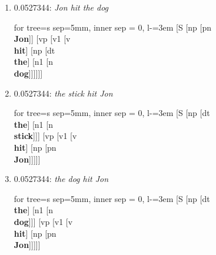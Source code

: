\documentclass[11pt]{article}
\begin{document}
\begin{enumerate}
	\item  0.0527344: \textit{Jon hit the dog} \\[0.5em]
	\begin{forest}
	for tree={s sep=5mm, inner sep = 0, l-=3em}
	[S [np [pn\\\textbf{Jon}]] [vp [v1 [v\\\textbf{hit}] [np [dt\\\textbf{the}] [n1 [n\\\textbf{dog}]]]]]]
	\end{forest}
	\newpage

	\item  0.0527344: \textit{the stick hit Jon} \\[0.5em]
	\begin{forest}
	for tree={s sep=5mm, inner sep = 0, l-=3em}
	[S [np [dt\\\textbf{the}] [n1 [n\\\textbf{stick}]]] [vp [v1 [v\\\textbf{hit}] [np [pn\\\textbf{Jon}]]]]]
	\end{forest}
	\newpage

	\item  0.0527344: \textit{the dog hit Jon} \\[0.5em]
	\begin{forest}
	for tree={s sep=5mm, inner sep = 0, l-=3em}
	[S [np [dt\\\textbf{the}] [n1 [n\\\textbf{dog}]]] [vp [v1 [v\\\textbf{hit}] [np [pn\\\textbf{Jon}]]]]]
	\end{forest}
	\newpage

\end{enumerate}
\end{document}
